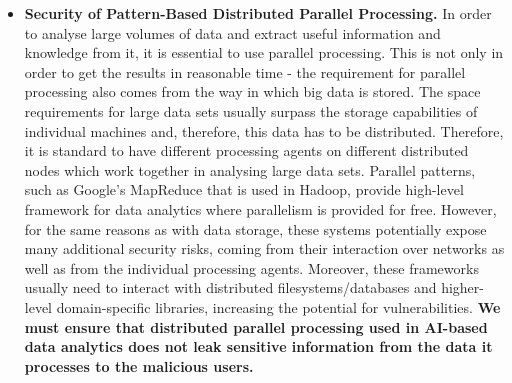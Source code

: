 \documentclass[a4paper,11pt]{article}
\begin{document}
\begin{itemize}
\item \textbf{Security of Pattern-Based Distributed Parallel Processing.} In order to analyse large volumes of data and extract useful information and knowledge from it, it is essential to use parallel processing. This is not only in order to get the results in reasonable time - the requirement for parallel processing also comes from the way in which big data is stored. The space requirements for large data sets usually surpass the storage capabilities of individual machines and, therefore, this data has to be distributed. %
Therefore, it is standard to have different processing agents on different distributed nodes which work together in analysing large data sets. Parallel patterns, such as Google's MapReduce that is used in Hadoop, provide high-level framework for data analytics where parallelism is provided for free. However, for the same reasons as with data storage, these systems potentially expose many additional security risks, coming from their interaction over networks as well as from the individual processing agents. Moreover, these frameworks usually need to interact with distributed filesystems/databases and higher-level domain-specific libraries, increasing the potential for vulnerabilities. \textbf{We must ensure that distributed parallel processing used in AI-based data analytics does not leak sensitive information from the data it processes to the malicious users.}


\end{itemize}
\end{document}
